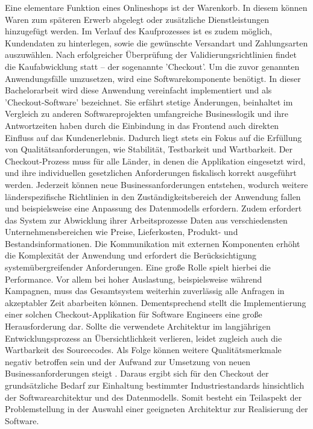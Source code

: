 Eine elementare Funktion eines Onlineshops ist der Warenkorb. In diesem können Waren zum späteren Erwerb abgelegt oder zusätzliche Dienstleistungen hinzugefügt werden. Im Verlauf des Kaufprozesses ist es zudem möglich, Kundendaten zu hinterlegen, sowie die gewünschte Versandart und Zahlungsarten auszuwählen. Nach erfolgreicher Überprüfung der Validierungsrichtlinien findet die Kaufabwicklung statt – der sogenannte 'Checkout'. Um die zuvor genannten Anwendungsfälle umzusetzen, wird eine Softwarekomponente benötigt. In dieser Bachelorarbeit wird diese Anwendung vereinfacht implementiert und als 'Checkout-Software' bezeichnet. Sie erfährt stetige Änderungen, beinhaltet im Vergleich zu anderen Softwareprojekten umfangreiche Businesslogik und ihre Antwortzeiten haben durch die Einbindung in das Frontend auch direkten Einfluss auf das Kundenerlebnis. Dadurch liegt stets ein Fokus auf die Erfüllung von Qualitätsanforderungen, wie Stabilität, Testbarkeit und Wartbarkeit. Der Checkout-Prozess muss für alle Länder, in denen die Applikation eingesetzt wird, und ihre individuellen gesetzlichen Anforderungen fiskalisch korrekt ausgeführt werden. Jederzeit können neue Businessanforderungen entstehen, wodurch weitere länderspezifische Richtlinien in den Zuständigkeitsbereich der Anwendung fallen und beispielsweise eine Anpassung des Datenmodells erfordern. Zudem erfordert das System zur Abwicklung ihrer Arbeitsprozesse Daten aus verschiedensten Unternehmensbereichen wie Preise, Lieferkosten, Produkt- und Bestandsinformationen. Die Kommunikation mit externen Komponenten erhöht die Komplexität der Anwendung und erfordert die Berücksichtigung systemübergreifender Anforderungen. Eine große Rolle spielt hierbei die Performance. Vor allem bei hoher Auslastung, beispielsweise während Kampagnen, muss das Gesamtsystem weiterhin zuverlässig alle Anfragen in akzeptabler Zeit abarbeiten können. Dementsprechend stellt die Implementierung einer solchen Checkout-Applikation für Software Engineers eine große Herausforderung dar. Sollte die verwendete Architektur im langjährigen Entwicklungsprozess an Übersichtlichkeit verlieren, leidet zugleich auch die Wartbarkeit des Sourcecodes. Als Folge können weitere Qualitätsmerkmale negativ betroffen sein und der Aufwand zur Umsetzung von neuen Businessanforderungen steigt \cite[S. 3f.]{Pigoski.2001}. Daraus ergibt sich für den Checkout der grundsätzliche Bedarf zur Einhaltung bestimmter Industriestandards hinsichtlich der Softwarearchitektur und des Datenmodells. Somit besteht ein Teilaspekt der Problemstellung in der Auswahl einer geeigneten Architektur zur Realisierung der Software. 

